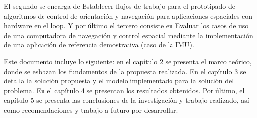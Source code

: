 El segundo se encarga de Establecer flujos de trabajo para el prototipado de algoritmos de control de orientación y navegación para aplicaciones espaciales con hardware en el loop. Y por último el tercero consiste en Evaluar los casos de uso de una computadora de navegación y control espacial mediante la implementación de una aplicación de referencia demostrativa (caso de la IMU).


Este documento incluye lo siguiente: en el capítulo 2 se presenta el marco teórico, donde se esbozan los fundamentos de la propuesta realizada. En el capítulo 3 se detalla la solución propuesta y el modelo implementado para la solución del problema. En el capítulo 4 se presentan los resultados obtenidos. Por último, el capítulo 5 se presenta las conclusiones de la investigación y trabajo realizado, así como recomendaciones y trabajo a futuro por desarrollar.

